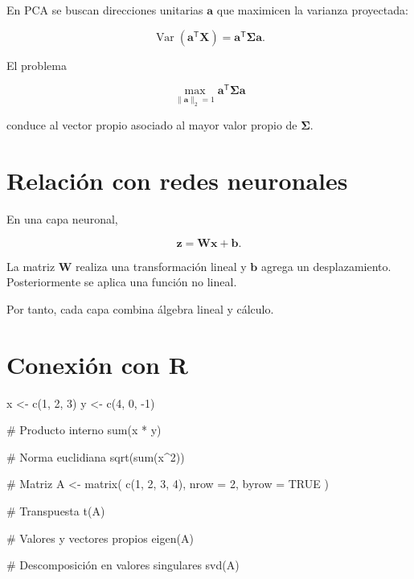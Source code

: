 \documentclass[
  spanish,
  11pt,
  letterpaper,
  DIV=11,
  numbers=noendperiod]{scrreprt}
\newenvironment{Shaded}{\begin{snugshade}}{\end{snugshade}}
\newcommand{\AttributeTok}[1]{\textcolor[rgb]{0.40,0.45,0.13}{#1}}
\newcommand{\CommentTok}[1]{\textcolor[rgb]{0.37,0.37,0.37}{#1}}
\newcommand{\ConstantTok}[1]{\textcolor[rgb]{0.56,0.35,0.01}{#1}}
\newcommand{\DecValTok}[1]{\textcolor[rgb]{0.68,0.00,0.00}{#1}}
\newcommand{\FunctionTok}[1]{\textcolor[rgb]{0.28,0.35,0.67}{#1}}
\newcommand{\NormalTok}[1]{\textcolor[rgb]{0.00,0.23,0.31}{#1}}
\newcommand{\OtherTok}[1]{\textcolor[rgb]{0.00,0.23,0.31}{#1}}
\newcommand{\SpecialCharTok}[1]{\textcolor[rgb]{0.37,0.37,0.37}{#1}}
\theoremstyle{definition}
\theoremstyle{plain}
\theoremstyle{definition}
\theoremstyle{remark}
\begin{document}
En PCA se buscan direcciones unitarias \(\mathbf{a}\) que maximicen la
varianza proyectada:

\[
\operatorname{Var}
(
\mathbf{a}^{\mathsf T}\mathbf{X}
)
=
\mathbf{a}^{\mathsf T}
\boldsymbol{\Sigma}
\mathbf{a}.
\]

El problema

\[
\max_{\|\mathbf{a}\|_2=1}
\mathbf{a}^{\mathsf T}
\boldsymbol{\Sigma}
\mathbf{a}
\]

conduce al vector propio asociado al mayor valor propio de
\(\boldsymbol{\Sigma}\).

\section{Relación con redes
neuronales}\label{relaciuxf3n-con-redes-neuronales}

En una capa neuronal,

\[
\mathbf{z}
=
\mathbf{W}\mathbf{x}
+
\mathbf{b}.
\]

La matriz \(\mathbf{W}\) realiza una transformación lineal y
\(\mathbf{b}\) agrega un desplazamiento. Posteriormente se aplica una
función no lineal.

Por tanto, cada capa combina álgebra lineal y cálculo.

\section{Conexión con R}\label{conexiuxf3n-con-r-1}

\begin{Shaded}
\begin{Highlighting}[]
\NormalTok{x }\OtherTok{\textless{}{-}} \FunctionTok{c}\NormalTok{(}\DecValTok{1}\NormalTok{, }\DecValTok{2}\NormalTok{, }\DecValTok{3}\NormalTok{)}
\NormalTok{y }\OtherTok{\textless{}{-}} \FunctionTok{c}\NormalTok{(}\DecValTok{4}\NormalTok{, }\DecValTok{0}\NormalTok{, }\SpecialCharTok{{-}}\DecValTok{1}\NormalTok{)}

\CommentTok{\# Producto interno}
\FunctionTok{sum}\NormalTok{(x }\SpecialCharTok{*}\NormalTok{ y)}

\CommentTok{\# Norma euclidiana}
\FunctionTok{sqrt}\NormalTok{(}\FunctionTok{sum}\NormalTok{(x}\SpecialCharTok{\^{}}\DecValTok{2}\NormalTok{))}

\CommentTok{\# Matriz}
\NormalTok{A }\OtherTok{\textless{}{-}} \FunctionTok{matrix}\NormalTok{(}
  \FunctionTok{c}\NormalTok{(}\DecValTok{1}\NormalTok{, }\DecValTok{2}\NormalTok{,}
    \DecValTok{3}\NormalTok{, }\DecValTok{4}\NormalTok{),}
  \AttributeTok{nrow =} \DecValTok{2}\NormalTok{,}
  \AttributeTok{byrow =} \ConstantTok{TRUE}
\NormalTok{)}

\CommentTok{\# Transpuesta}
\FunctionTok{t}\NormalTok{(A)}

\CommentTok{\# Valores y vectores propios}
\FunctionTok{eigen}\NormalTok{(A)}

\CommentTok{\# Descomposición en valores singulares}
\FunctionTok{svd}\NormalTok{(A)}
\end{Highlighting}
\end{Shaded}
\end{document}
